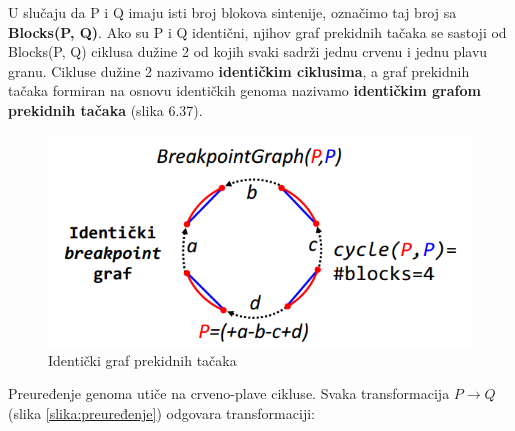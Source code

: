 U slučaju da P i Q imaju isti broj blokova sintenije, označimo taj broj sa \textbf{Blocks(P, Q)}. Ako su P i Q identični, njihov graf prekidnih tačaka se sastoji od Blocks(P, Q) ciklusa dužine 2 od kojih svaki sadrži jednu crvenu i jednu plavu granu. Cikluse dužine 2 nazivamo \textbf{identičkim ciklusima}, a graf prekidnih tačaka formiran na osnovu identičkih genoma nazivamo \textbf{identičkim grafom prekidnih tačaka} (slika 6.37).

\begin{figure}[h!]
\centering
\includegraphics[scale=0.6]{poglavlja/6/slike/identicki.PNG}
\caption{Identički graf prekidnih tačaka}
\label{slika:maxCycle}
\end{figure}

Preuređenje genoma utiče na crveno-plave cikluse. Svaka transformacija $P\rightarrow Q$ (slika \ref{slika:preuređenje}) odgovara transformaciji:

